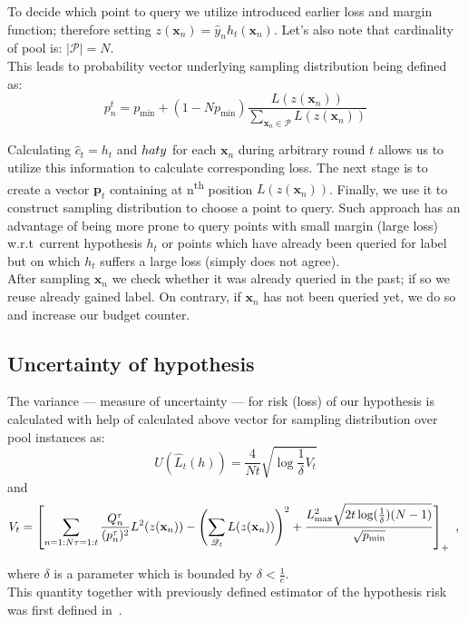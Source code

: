 \documentclass[12pt, a4paper, pdflatex]{report}
\newcommand{\ts}{\textsuperscript}
\begin{document}
To decide which point to query we utilize introduced earlier loss and margin function; therefore setting $z(\mathbf{x}_n) = \hat{y}_n h_t(\mathbf{x}_n)$. Let's also note that cardinality of pool is: $|\mathscr{P}| = N$.\\
This leads to probability vector underlying sampling distribution being defined as:
$$
p_n^t = p_{\text{min}} + (1-Np_{\text{min}}) \frac{L(z(\mathbf{x}_n))}{\sum_{\mathbf{x}_n \in \mathscr{P}} L(z(\mathbf{x}_n))}
$$

Calculating $\hat{c}_t = h_t$ and $\\hat{y}$ for each $\mathbf{x}_n$ during arbitrary round $t$ allows us to utilize this information to calculate corresponding loss. The next stage is to create a vector $\mathbf{p}_t$ containing at n\ts{th} position $L(z(\mathbf{x}_n))$. Finally, we use it to construct sampling distribution to choose a point to query. Such approach has an advantage of being more prone to query points with small margin (large loss) w.r.t\ current hypothesis $h_t$ or points which have already been queried for label but on which $h_t$ suffers a large loss (simply does not agree).\\

After sampling $\mathbf{x}_n$ we check whether it was already queried in the past; if so we reuse already gained label. On contrary, if $\mathbf{x}_n$ has not been queried yet, we do so and increase our budget counter.


\subsection{Uncertainty of hypothesis}
The variance --- measure of uncertainty --- for risk (loss) of our hypothesis is calculated with help of calculated above vector for sampling distribution over pool instances as:
\begin{equation}\label{eq:variance}
U(\hat{L}_t(h)) = \frac{4}{Nt} \sqrt{\log\frac{1}{\delta}V_t}
\end{equation}
and
$$
V_t = \left[
\sum_{n = 1:N \\ \tau = 1:t} \frac{Q^\tau_n}{(p^\tau_n)^2} L^2(z(\mathbf{x}_n))
-
\left( \sum_{\mathscr{Q}_t} L(z(\mathbf{x}_n)) \right)^2
+
\frac{L^2_{\text{max}}  \sqrt{2t \log(\frac{1}{\delta}) (N-1)} } {\sqrt{p_{\text{min}}}}
\right]_+ \text{~,~}
$$

where $\delta$ is a parameter which is bounded by $\delta < \frac{1}{e}$.\\

This quantity together with previously defined estimator of the hypothesis risk was first defined in~\cite{DBLP:journals/corr/GantiG13}.\\
\end{document}
